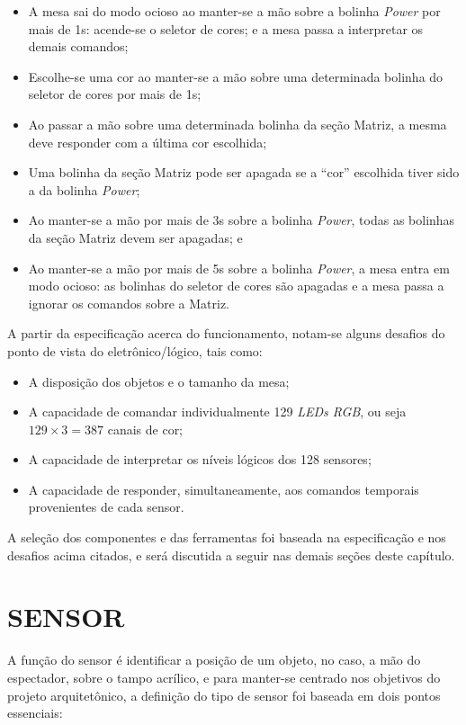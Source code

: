 \begin{itemize}[noitemsep]
    \item A mesa sai do modo ocioso ao manter-se a mão sobre a bolinha \emph{Power} por mais de 1s: acende-se o seletor de cores; e a mesa passa a interpretar os demais comandos;
    \item Escolhe-se uma cor ao manter-se a mão sobre uma determinada bolinha do seletor de cores por mais de 1s;
    \item Ao passar a mão sobre uma determinada bolinha da seção Matriz, a mesma deve responder com a última cor escolhida;
    \item Uma bolinha da seção Matriz pode ser apagada se a ``cor'' escolhida tiver sido a da bolinha \emph{Power};
    \item Ao manter-se a mão por mais de 3s sobre a bolinha \emph{Power}, todas as bolinhas da seção Matriz devem ser apagadas; e
    \item Ao manter-se a mão por mais de 5s sobre a bolinha \emph{Power}, a mesa entra em modo ocioso: as bolinhas do seletor de cores são apagadas e a mesa passa a ignorar os comandos sobre a Matriz.
\end{itemize}

A partir da especificação acerca do funcionamento, notam-se alguns desafios do ponto de vista do eletrônico/lógico, tais como:

\begin{itemize}
    \item A disposição dos objetos e o tamanho da mesa;
    \item A capacidade de comandar individualmente 129 \emph{LEDs RGB}, ou seja $129 \times 3 = 387$ canais de cor;
    \item A capacidade de interpretar os níveis lógicos dos 128 sensores;
    \item A capacidade de responder, simultaneamente, aos comandos temporais provenientes de cada sensor.
\end{itemize}

A seleção dos componentes e das ferramentas foi baseada na especificação e nos desafios acima citados, e será discutida a seguir nas demais seções deste capítulo.

\section{SENSOR}
\label{sec:sensor}

A função do sensor é identificar a posição de um objeto, no caso, a mão do espectador, sobre o tampo acrílico, e para manter-se centrado nos objetivos do projeto arquitetônico, a definição do tipo de sensor foi baseada em dois pontos essenciais:

